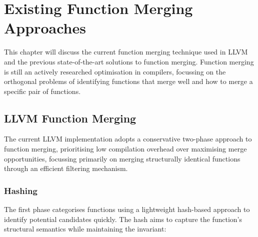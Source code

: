 

\section{Existing Function Merging Approaches} \label{Background:RelatedWork}
This chapter will discuss the current function merging technique used in LLVM and the previous state-of-the-art solutions to function merging. Function merging is still an actively researched optimisation in compilers, focussing on the orthogonal problems of identifying functions that merge well and how to merge a specific pair of functions.

\subsection{LLVM Function Merging}
The current LLVM implementation adopts a conservative two-phase approach to function merging, prioritising low compilation overhead over maximising merge opportunities, focussing primarily on merging structurally identical functions through an efficient filtering mechanism. 


\subsubsection{Hashing}
The first phase categorises functions using a lightweight hash-based approach to identify potential candidates quickly. The hash aims to capture the function's structural semantics while maintaining the invariant:

